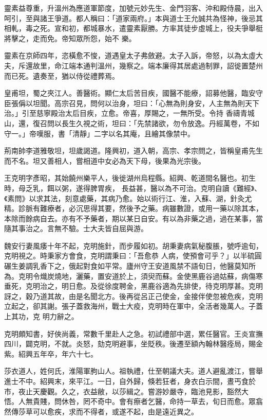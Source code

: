 \begin{pinyinscope}
 靈素益尊重，升溫州為應道軍節度，加號元妙先生、金門羽客、沖和殿侍晨，出入呵引，至與諸王爭道。都人稱曰：「道家兩府。」本與道士王允誠共為怪神，後忌其相軋，毒之死。宣和初，都城暴水，遣靈素厭勝。方率其徒步虛城上，役夫爭舉梃將擊之，走而免。帝知眾所怨，始不
 樂。



 靈素在京師四年，恣橫愈不悛，道遇皇太子弗斂避。太子入訴，帝怒，以為太虛大夫，斥還故里，命江端本通判溫州，幾察之。端本廉得其居處過制罪，詔徙置楚州而已死。遺奏至，猶以侍從禮葬焉。



 皇甫坦，蜀之夾江人。善醫術。顯仁太后苦目疾，國醫不能療，詔募他醫，臨安守臣張偁以坦聞。高宗召見，問何以治身，坦曰：「心無為則身安，人主無為則天下治。」引至慈寧殿治太后目疾，立愈。帝喜，厚賜之，一無所受。令持
 香禱青城山，還，復召問以長生久視之術，坦曰：「先禁諸欲，勿令放逸。丹經萬卷，不如守一。」帝嘆服，書「清靜」二字以名其庵，且繪其像禁中。



 荊南帥李道雅敬坦，坦歲謁道。隆興初，道入朝，高宗、孝宗問之，皆稱皇甫先生而不名。坦又善相人，嘗相道中女必為天下母，後果為光宗後。



 王克明字彥昭，其始饒州樂平人，後徙湖州烏程縣。紹興、乾道間名醫也。初生時，母乏乳，餌以粥，遂得脾胃疾，
 長益甚，醫以為不可治。克明自讀《難經》、《素問》以求其法，刻意處藥，其病乃愈。始以術行江、淮，入蘇、湖，針灸尤精。診脈有難療者，必沉思得其要，然後予之藥。病雖數證，或用一藥以除其本，本除而餘病自去。亦有不予藥者，期以某日自安。有以為非藥之過，過在某事，當隨其事治之。言無不驗。士大夫皆自屈與游。



 魏安行妻風痿十年不起，克明施針，而步履如初。胡秉妻病氣秘腹脹，號呼逾旬，克明視之。時秉家方會食，克明謂秉曰：「吾愈恭
 人病，使預會可乎？」以半硫圓碾生姜調乳香下之，俄起對食如平常。廬州守王安道風禁不語旬日，他醫莫知所為。克明令熾炭燒地，灑藥，置安道於上，須臾而蘇。金使黑鹿谷過姑蘇，病傷寒垂死，克明治之，明日愈。及從徐度聘金，黑鹿谷適為先排使，待克明厚甚。克明訝之，穀乃道其故，由是名聞北方。後再從呂正己使金，金接伴使忽被危疾，克明立起之，卻其謝。張子蓋救海州，戰士大疫，克明時在軍中，全活者幾萬人。子蓋上其功，克
 明力辭之。



 克明頗知書，好俠尚義，常數千里赴人之急。初試禮部中選，累任醫官。王炎宣撫四川，闢克明，不就。炎怒，劾克明避事，坐貶秩。後遷至額內翰林醫痊局，賜金紫。紹興五年卒，年六十七。



 莎衣道人，姓何氏，淮陽軍朐山人。祖執禮，仕至朝議大夫。道人避亂渡江，嘗舉進士不中。紹興末，來平江。一日，自外歸，倏若狂者，身衣白示間，晝丐食於市，夜止天慶觀。久之，衣益敝，以莎緝之。嘗游妙嚴寺，臨池見影，豁然大
 悟。人無貴賤，問休咎，罔不奇中。會有瘵者乞醫，命持一草去，旬日而愈。眾翕然傳莎草可以愈疾，求而不得者，或遂不起，由是遠近異之。




\end{pinyinscope}
